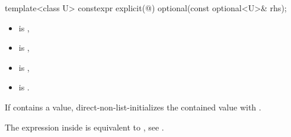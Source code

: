 %
\begin{itemdecl}
template<class U> constexpr explicit(@\seebelow@) optional(const optional<U>& rhs);
\end{itemdecl}

\begin{itemdescr}
\pnum
\constraints
\begin{itemize}
\item {} is ,
\item {} is ,
\item {} is ,
\item {} is .
\end{itemize}

\pnum
\effects
If  contains a value, direct-non-list-initializes the contained value with .

\pnum
\remarks
The expression inside  is equivalent to , see .
\end{itemdescr}
